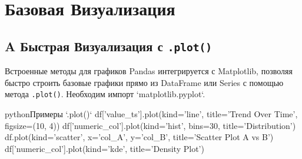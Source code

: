 \section{Базовая Визуализация}

\subsection{A Быстрая Визуализация с \texttt{.plot()}}

\begin{myexampleblock}{Встроенные методы для графиков}
    Pandas интегрируется с Matplotlib, позволяя быстро строить базовые графики прямо из DataFrame или Series с помощью метода \texttt{.plot()}. Необходим импорт `matplotlib.pyplot`.
    \begin{codebox}{python}{Примеры `.plot()`}
    df['value_ts'].plot(kind='line', title='Trend Over Time', figsize=(10, 4))
    df['numeric_col'].plot(kind='hist', bins=30, title='Distribution')
    df.plot(kind='scatter', x='col_A', y='col_B', title='Scatter Plot A vs B')
    df['numeric_col'].plot(kind='kde', title='Density Plot')
    \end{codebox}
\end{myexampleblock}